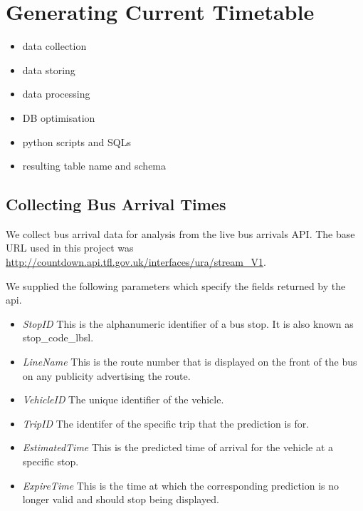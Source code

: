 \section{Generating Current Timetable}
\label{sec:current_timetable_generation}

\begin{itemize}
  \item data collection
  \item data storing
  \item data processing
  \item DB optimisation
  \item python scripts and SQLs
  \item resulting table name and schema
\end{itemize}

\subsection{Collecting Bus Arrival Times}
\label{sec:collecting_arrival_times}

\par We collect bus arrival data for analysis from the live bus arrivals API. The base URL used in this project was \url{http://countdown.api.tfl.gov.uk/interfaces/ura/stream_V1}.

\par We supplied the following parameters which specify the fields returned by the \acrshort{api}.

\begin{itemize}
  \item \textit{StopID} This is the alphanumeric identifier of a bus stop. It is also known as stop\_code\_lbsl.
  \item \textit{LineName} This is the route number that is displayed on the front of the bus on any publicity advertising the route.
  \item \textit{VehicleID} The unique identifier of the vehicle.
  \item \textit{TripID} The identifer of the specific trip that the prediction is for.
  \item \textit{EstimatedTime} This is the predicted time of arrival for the vehicle at a specific stop.
  \item \textit{ExpireTime} This is the time at which the corresponding prediction is no longer valid and should stop being displayed.
\end{itemize}

